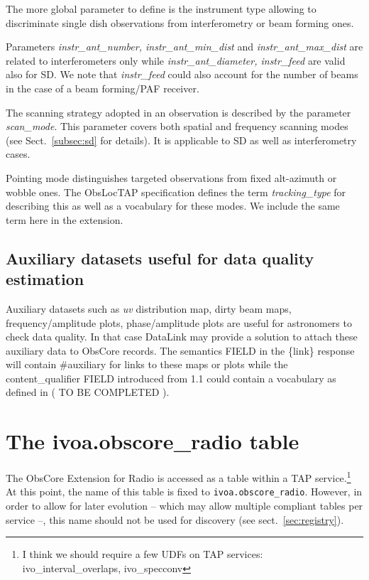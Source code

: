 \documentclass[11pt,a4paper]{ivoa}
\begin{document}
The more global parameter to define is the instrument type allowing to discriminate single dish observations from interferometry or beam forming ones.

Parameters \emph{instr\_ant\_number, instr\_ant\_min\_dist} and  \emph{instr\_ant\_max\_dist} are related to interferometers only while 
\emph{instr\_ant\_diameter, instr\_feed } are valid also for SD.
We note that \emph{instr\_feed} could also  account for the number of beams in the case of a beam forming/PAF receiver.

The scanning strategy adopted in an observation is described by the parameter \emph{scan\_mode}. This parameter covers both spatial
and frequency scanning modes (see Sect.~\ref{subsec:sd} for details).
It is applicable to  SD as well as  interferometry cases.

Pointing mode distinguishes targeted observations from  fixed alt-azimuth or wobble ones. The ObsLocTAP specification \citep{2021ivoa.spec.0724S} defines the term \emph{tracking\_type} for describing this as well as a  vocabulary for these modes. 
We include the same term here in the extension.

\subsection{Auxiliary datasets useful for data quality estimation}

Auxiliary datasets such as  \emph{uv} distribution map, dirty beam maps, frequency/amplitude plots, phase/amplitude plots are useful for astronomers to check data quality.
In that case DataLink \citep{2015ivoa.spec.0617D} may provide a solution to attach these auxiliary data to ObsCore records. The semantics FIELD in the \{link\}
response  will contain \#auxiliary  for links to these maps or plots while  the content\_qualifier FIELD introduced from 1.1  could contain a vocabulary as defined in ( TO BE COMPLETED ).


\section{The ivoa.obscore\_radio table}
\label{sec:implementation}
The ObsCore Extension for Radio is accessed as a table within a TAP
\citep{2019ivoa.spec.0927D} service.\footnote{I think we should require a
few UDFs on TAP services: ivo\_interval\_overlaps, ivo\_specconv}  At this
point, the name of this table is fixed to \verb|ivoa.obscore_radio|.
However, in order to allow for later evolution -- which may allow
multiple compliant tables per service --, this name should not be used
for discovery (see sect.~\ref{sec:registry}).
\end{document}
